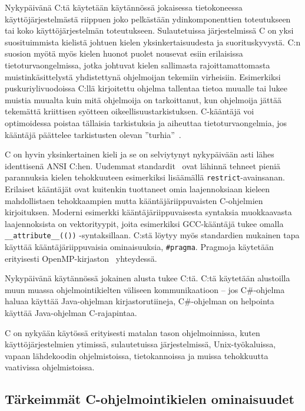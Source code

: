 Nykypäivänä C:tä käytetään käytännössä jokaisessa tietokoneessa
käyttöjärjestelmästä riippuen joko pelkästään ydinkomponenttien toteutukseen
tai koko käyttöjärjestelmän toteutukseen. Sulautetuissa järjestelmissä C on
yksi suosituimmista kielistä johtuen kielen yksinkertaisuudesta ja
suorituskyvystä. C:n suosion myötä myös kielen huonot puolet nousevat esiin
erilaisissa tietoturvaongelmissa, jotka johtuvat kielen sallimasta
rajoittamattomasta muistinkäsittelystä yhdistettynä ohjelmoijan tekemiin
virheisiin. Esimerkiksi puskuriylivuodoissa C:llä kirjoitettu ohjelma tallentaa
tietoa muualle tai lukee muistia muualta kuin mitä ohjelmoija on tarkoittanut,
kun ohjelmoija jättää tekemättä kriittisen syötteen oikeellisuustarkistuksen.
C-kääntäjä voi optimoidessa poistaa tällaisia tarkistuksia ja aiheuttaa
tietoturvaongelmia, jos kääntäjä päättelee tarkistusten olevan
''turhia''~\citep{redhatsecurity}.

C on hyvin yksinkertainen kieli ja se on selviytynyt nykypäivään asti lähes
identtisenä ANSI C:hen. Uudemmat standardit~\citep{C99, C11, C18} ovat lähinnä
tehneet pieniä parannuksia kielen tehokkuuteen esimerkiksi lisäämällä
\texttt{restrict}-avainsanan. Erilaiset kääntäjät ovat kuitenkin tuottaneet
omia laajennoksiaan kieleen mahdollistaen tehokkaampien mutta
kääntäjäriippuvaisten C-ohjelmien kirjoituksen. Moderni esimerkki
kääntäjäriippuvaisesta syntaksia muokkaavasta laajennoksista on vektorityypit,
joita esimerkiksi GCC-kääntäjä tukee omalla \texttt{\_\_attribute\_\_(())}
-syntaksillaan. C:stä löytyy myös standardien mukainen tapa käyttää
kääntäjäriippuvaisia ominaisuuksia, \texttt{\#pragma}. Pragmoja käytetään
erityisesti OpenMP-kirjaston~\citep{openmp} yhteydessä.

Nykypäivänä käytännössä jokainen alusta tukee C:tä. C:tä käytetään alustoilla
muun muassa ohjelmointikielten väliseen kommunikaatioon -- jos C\#-ohjelma
haluaa käyttää Java-ohjelman kirjastorutiineja, C\#-ohjelman on helpointa
käyttää Java-ohjelman C-rajapintaa.

C on nykyään käytössä erityisesti matalan tason ohjelmoinnissa, kuten
käyttöjärjestelmien ytimissä, sulautetuissa järjestelmissä, Unix-työkaluissa,
vapaan lähdekoodin ohjelmistoissa, tietokannoissa ja muissa tehokkuutta
vaativissa ohjelmistoissa.

\subsection{Tärkeimmät C-ohjelmointikielen ominaisuudet}
\label{sec:cominaisuudet}

